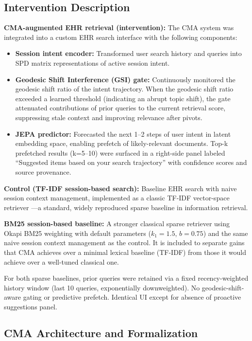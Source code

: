 \documentclass[preprint,12pt]{elsarticle}
\begin{document}
\subsection{Intervention Description}

\textbf{CMA-augmented EHR retrieval (intervention):} The CMA system was integrated into a custom EHR search interface with the following components:
\begin{itemize}
  \item \textbf{Session intent encoder:} Transformed user search history and queries into SPD matrix representations of active session intent.
  \item \textbf{Geodesic Shift Interference (GSI) gate:} Continuously monitored the geodesic shift ratio of the intent trajectory. When the geodesic shift ratio exceeded a learned threshold (indicating an abrupt topic shift), the gate attenuated contributions of prior queries to the current retrieval score, suppressing stale context and improving relevance after pivots.
  \item \textbf{JEPA predictor:} Forecasted the next 1--2 steps of user intent in latent embedding space, enabling prefetch of likely-relevant documents. Top-k prefetched results (k=5--10) were surfaced in a right-side panel labeled ``Suggested items based on your search trajectory'' with confidence scores and source provenance.
\end{itemize}

\textbf{Control (TF-IDF session-based search):} Baseline EHR search with naive session context management, implemented as a classic TF-IDF vector-space retriever \citep{salton83}---a standard, widely reproduced sparse baseline in information retrieval.

\textbf{BM25 session-based baseline:} A stronger classical sparse retriever using Okapi BM25 weighting \citep{robertson1995,robertson1976} with default parameters ($k_1=1.5$, $b=0.75$) and the same naive session context management as the control. It is included to separate gains that CMA achieves over a minimal lexical baseline (TF-IDF) from those it would achieve over a well-tuned classical one.

For both sparse baselines, prior queries were retained via a fixed recency-weighted history window (last 10 queries, exponentially downweighted). No geodesic-shift-aware gating or predictive prefetch. Identical UI except for absence of proactive suggestions panel.

\subsection{CMA Architecture and Formalization}
\end{document}
